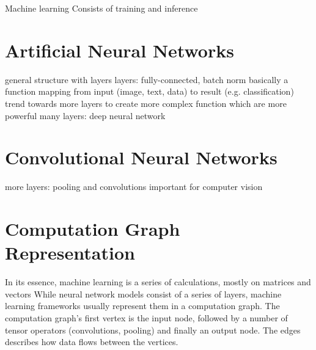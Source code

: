 Machine learning
Consists of training and inference
\section{Artificial Neural Networks}
general structure with layers
layers: fully-connected, batch norm
basically a function mapping from input (image, text, data) to result (e.g. classification)
trend towards more layers to create more complex function which are more powerful
many layers: deep neural network
\section{Convolutional Neural Networks}
more layers: pooling and convolutions
important for computer vision

\section{Computation Graph Representation}
In its essence, machine learning is a series of calculations, mostly on matrices and vectors
While neural network models consist of a series of layers, machine learning frameworks usually represent them in a computation graph.
The computation graph's first vertex is the input node, followed by a number of tensor operators (convolutions, pooling) and finally an output node.
The edges describes how data flows between the vertices.
